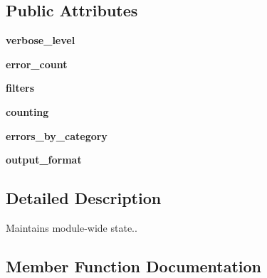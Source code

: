 \subsection*{Public Attributes}
\begin{DoxyCompactItemize}
\item 
{\bfseries verbose\+\_\+level}\hypertarget{classcpplint_1_1__CppLintState_a94328754c2f7481f4da9757a9dede308}{}\label{classcpplint_1_1__CppLintState_a94328754c2f7481f4da9757a9dede308}

\item 
{\bfseries error\+\_\+count}\hypertarget{classcpplint_1_1__CppLintState_a4039ff9668057eff4549b99905ce753b}{}\label{classcpplint_1_1__CppLintState_a4039ff9668057eff4549b99905ce753b}

\item 
{\bfseries filters}\hypertarget{classcpplint_1_1__CppLintState_a8443105b9623383ab75fa242009c006e}{}\label{classcpplint_1_1__CppLintState_a8443105b9623383ab75fa242009c006e}

\item 
{\bfseries counting}\hypertarget{classcpplint_1_1__CppLintState_acd4f4157637d141a4de63bf10d2ca755}{}\label{classcpplint_1_1__CppLintState_acd4f4157637d141a4de63bf10d2ca755}

\item 
{\bfseries errors\+\_\+by\+\_\+category}\hypertarget{classcpplint_1_1__CppLintState_afb33527113706b5fcae07d680d8cec99}{}\label{classcpplint_1_1__CppLintState_afb33527113706b5fcae07d680d8cec99}

\item 
{\bfseries output\+\_\+format}\hypertarget{classcpplint_1_1__CppLintState_a5c68ca79b0ff9b2fba1c488a7b2bd3f0}{}\label{classcpplint_1_1__CppLintState_a5c68ca79b0ff9b2fba1c488a7b2bd3f0}

\end{DoxyCompactItemize}


\subsection{Detailed Description}
\begin{DoxyVerb}Maintains module-wide state..\end{DoxyVerb}
 

\subsection{Member Function Documentation}
